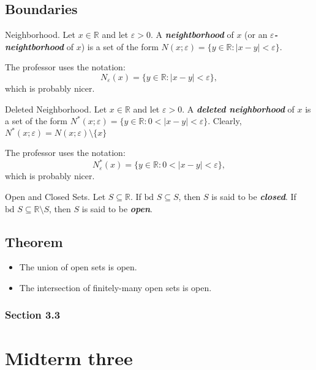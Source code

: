 \documentclass[12pt]{article}
\newcommand\bd[1]{\text{bd }#1}
\newcommand\abs[1]{\left|#1\right|}
\newcommand\Real{\mathbb{R}}
\newcommand\sube{\subseteq}
\begin{document}
\subsection{Boundaries}
\label{sec:org03fc252}
\begin{definition}{Neighborhood.}
  Let $x\in\Real$ and let $\varepsilon>0$. A \textit{\textbf{neightborhood}}
  of $x$ (or an \textit{\textbf{$\varepsilon$-neightborhood}} of $x$) is a
  set of the form $N(x; \varepsilon)=\{y\in\Real : \abs{x-y}<\varepsilon\}$.
  \begin{remark}
    The professor uses the notation: $$N_\varepsilon(x)=\{y\in\Real :
    \abs{x-y}<\varepsilon\},$$ which is probably nicer.
  \end{remark}
\end{definition}

\begin{definition}{Deleted Neighborhood.}
  Let $x\in\Real$ and let $\varepsilon>0$. A \textit{\textbf{deleted
      neighborhood}} of $x$ is a set of the form $N^*(x;\varepsilon)=\{y\in\Real
  : 0<\abs{x-y}<\varepsilon\}$. Clearly, $N^*(x;\varepsilon) =
  N(x;\varepsilon)\setminus\{x\}$
  \begin{remark}
    The professor uses the notation: $$N_\varepsilon^*(x)=\{y\in\Real :
    0<\abs{x-y}<\varepsilon\},$$ which is probably nicer.
  \end{remark}
\end{definition}

\begin{definition}{Open and Closed Sets.}
  Let $S \sube \Real$. If $\bd{S} \sube S$, then $S$ is said to be
  \textit{\textbf{closed}}. If $\bd{S} \sube \Real \setminus S$, then $S$ is
  said to be \textit{\textbf{open}}.
\end{definition}

\subsection{Theorem}
\label{sec:org70e3566}
\begin{itemize}
\item The union of open sets is open.
\item The intersection of finitely-many open sets is open.
\end{itemize}
\subsubsection{Section 3.3}
\label{sec:org945739c}
\section{Midterm three}
\label{sec:orgac8eebf}
\end{document}
